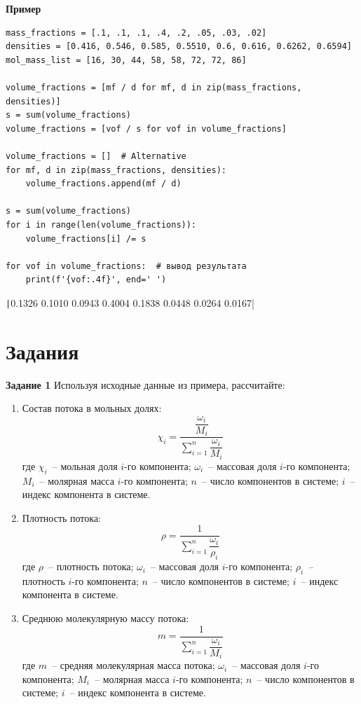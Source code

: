 \documentclass[aspectratio=169, mathserif]{beamer}%
\begin{document}
\begin{frame}[fragile]{\space}
\scriptsize
\begin{alertblock}{\textbf{Пример}}
\begin{verbatim}
mass_fractions = [.1, .1, .1, .4, .2, .05, .03, .02]
densities = [0.416, 0.546, 0.585, 0.5510, 0.6, 0.616, 0.6262, 0.6594]
mol_mass_list = [16, 30, 44, 58, 58, 72, 72, 86]

volume_fractions = [mf / d for mf, d in zip(mass_fractions, densities)]
s = sum(volume_fractions)
volume_fractions = [vof / s for vof in volume_fractions]

volume_fractions = []  # Alternative
for mf, d in zip(mass_fractions, densities):
    volume_fractions.append(mf / d)

s = sum(volume_fractions)
for i in range(len(volume_fractions)):
    volume_fractions[i] /= s
    
for vof in volume_fractions:  # вывод результата
    print(f'{vof:.4f}', end=' ')
\end{verbatim}
\texttt|0.1326 0.1010 0.0943 0.4004 0.1838 0.0448 0.0264 0.0167|
\end{alertblock}
\vfill
\end{frame}


\section{Задания}
\sectionframe

\begin{frame}[fragile]
\scriptsize
\begin{alertblock}{\textbf{Задание 1}}
Используя исходные данные из примера, рассчитайте:
\end{alertblock}
\vfill
\begin{enumerate}
	\item Состав потока в мольных долях: 
	$$
		\chi _i = \dfrac{\dfrac{\omega _i}{M_i}}{\sum \limits_{i=1}^{n}\dfrac{\omega _i}{M_i}}
	$$
	где $\chi _i$~-- мольная доля $i$-го компонента; $\omega _i$~-- массовая доля $i$-го компонента; $M_i$~-- молярная масса $i$-го компонента; $n$~-- число компонентов в системе; $i$~-- индекс компонента в системе.
	\item Плотность потока:
	$$
		\rho = \dfrac{1}{\sum \limits_{i=1}^{n}\dfrac{\omega_i}{\rho_i}}
	$$
	где $\rho$~-- плотность потока; $\omega _i$~-- массовая доля $i$-го компонента; $\rho _i$~-- плотность $i$-го компонента; $n$~-- число компонентов в системе; $i$~-- индекс компонента в системе.
	\item Среднюю молекулярную массу потока:
	$$
		m = \dfrac{1}{\sum \limits_{i=1}^{n}\dfrac{\omega_i}{M_i}}
	$$
	где $m$~-- средняя молекулярная масса потока; $\omega _i$~-- массовая доля $i$-го компонента; $M_i$~-- молярная масса $i$-го компонента; $n$~-- число компонентов в системе; $i$~-- индекс компонента в системе.
\end{enumerate}
\vfill
\end{frame}
\end{document}
